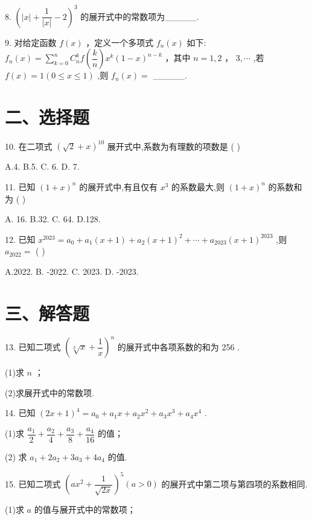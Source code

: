 8. ${\left( \left| x\right|  + \dfrac{1}{\left| x\right| } - 2\right) }^{3}$ 的展开式中的常数项为\_\_\_\_\_.

9. 对给定函数 $f\left( x\right)$ ，定义一个多项式 ${f}_{n}\left( x\right)$ 如下: ${f}_{n}\left( x\right)  = \mathop{\sum }\limits_{{k = 0}}^{n}{{C}}_{n}^{k}f\left( \dfrac{k}{n}\right) {x}^{k}{\left( 1 - x\right) }^{n - k}$ ，其中 $n = 1,2$ ， $3,\cdots$ ,若 $f\left( x\right)  = 1\left( {0 \leq  x \leq  1}\right)$ ,则 ${f}_{n}\left( x\right)  =$ \_\_\_\_\_.

\section*{二、选择题}

10. 在二项式 ${\left( \sqrt{2} + x\right) }^{10}$ 展开式中,系数为有理数的项数是 ( )

A.4. B.5. C. 6. D. 7.

11. 已知 ${\left( 1 + x\right) }^{n}$ 的展开式中,有且仅有 ${x}^{3}$ 的系数最大,则 ${\left( 1 + x\right) }^{n}$ 的系数和为 ( )

A. 16. B.32. C. 64. D.128.

12. 已知 ${x}^{2023} = {a}_{0} + {a}_{1}\left( {x + 1}\right)  + {a}_{2}{\left( x + 1\right) }^{2} + \cdots  + {a}_{2023}{\left( x + 1\right) }^{2023}$ ,则 ${a}_{2022} =$ ( )

A.2022. B. -2022. C. 2023. D. -2023.

\section*{三、解答题}

13. 已知二项式 ${\left( \sqrt[3]{x} + \dfrac{1}{x}\right) }^{n}$ 的展开式中各项系数的和为 256 .

(1)求 $n$ ；

(2)求展开式中的常数项.

14. 已知 ${\left( 2x + 1\right) }^{4} = {a}_{0} + {a}_{1}x + {a}_{2}{x}^{2} + {a}_{3}{x}^{3} + {a}_{4}{x}^{4}$ .

(1)求 $\dfrac{{a}_{1}}{2} + \dfrac{{a}_{2}}{4} + \dfrac{{a}_{3}}{8} + \dfrac{{a}_{4}}{16}$ 的值；

(2) 求 ${a}_{1} + 2{a}_{2} + 3{a}_{3} + 4{a}_{4}$ 的值.

15. 已知二项式 ${\left( a{x}^{2} + \dfrac{1}{\sqrt{2x}}\right) }^{5}\left( {a > 0}\right)$ 的展开式中第二项与第四项的系数相同.

(1)求 $a$ 的值与展开式中的常数项；

